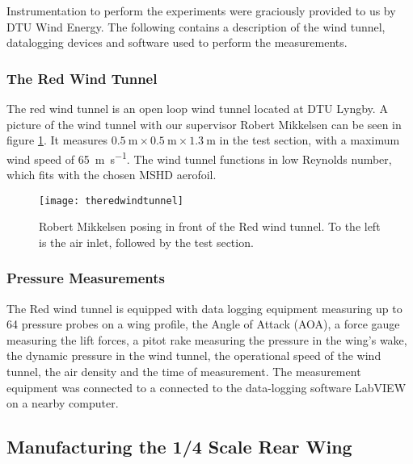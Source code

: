     Instrumentation to perform the experiments were graciously provided to us by DTU Wind Energy. The following contains a description of the wind tunnel, datalogging devices and software used to perform the measurements.

    \subsubsection{The Red Wind Tunnel}

      The red wind tunnel is an open loop wind tunnel located at DTU Lyngby. A picture of the wind tunnel with our supervisor Robert Mikkelsen can be seen in figure \ref{fig:theredwindtunnel}. It measures $\SI{0.5}{\metre} \times \SI{0.5}{\metre} \times \SI{1.3}{\metre}$ in the test section, with a maximum wind speed of \SI{65}{\metre\per\second}. The wind tunnel functions in low Reynolds number, which fits with the chosen MSHD aerofoil.

      \begin{figure}
        \texttt{[image: theredwindtunnel]}
        \caption{Robert Mikkelsen posing in front of the Red wind tunnel. To the left is the air inlet, followed by the test section.}
        \label{fig:theredwindtunnel}
      \end{figure}

    \subsubsection{Pressure Measurements}

      The Red wind tunnel is equipped with data logging equipment measuring up to 64 pressure probes on a wing profile, the Angle of Attack (AOA), a force gauge measuring the lift forces, a pitot rake measuring the pressure in the wing's wake, the dynamic pressure in the wind tunnel, the operational speed of the wind tunnel, the air density and the time of measurement. The measurement equipment was connected to a  connected to the data-logging software LabVIEW on a nearby computer.

  \subsection{Manufacturing the 1/4 Scale Rear Wing}

  
